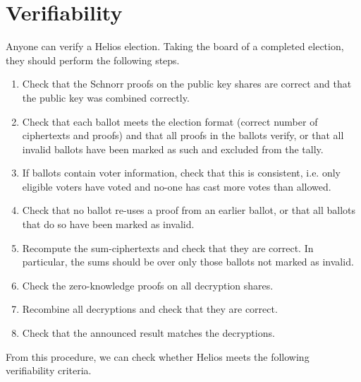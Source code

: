 \documentclass{llncs}
\begin{document}
\section{Verifiability}

Anyone can verify a Helios election. Taking the board of a completed election,
they should perform the following steps.
\begin{enumerate}
\item Check that the Schnorr proofs on the public key shares are correct and
that the public key was combined correctly.
\item Check that each ballot meets the election format (correct number of
ciphertexts and proofs) and that all proofs in the ballots verify, or that all
invalid ballots have been marked as such and excluded from the tally.
\item If ballots contain voter information, check that this is consistent, i.e.
only eligible voters have voted and no-one has cast more votes than allowed.
\item Check that no ballot re-uses a proof from an earlier ballot, or that all
ballots that do so have been marked as invalid.
\item Recompute the sum-ciphertexts and check that they are correct.
In particular, the sums should be over only those ballots not marked as invalid.
\item Check the zero-knowledge proofs on all decryption shares.
\item Recombine all decryptions and check that they are correct.
\item Check that the announced result matches the decryptions.
\end{enumerate}

From this procedure, we can check whether Helios meets the following
verifiability criteria.
\end{document}
